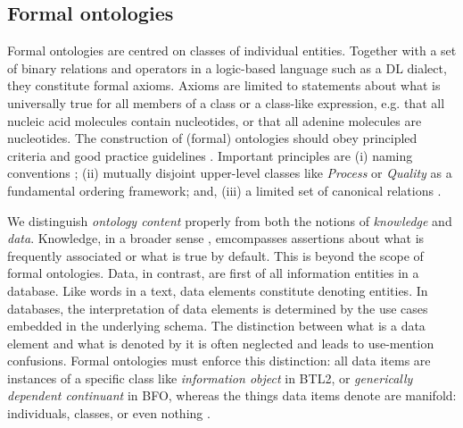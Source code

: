 \subsection*{Formal ontologies}

Formal ontologies are centred on classes of individual entities. Together with a set of binary relations and operators in a logic-based language such as a DL dialect, they constitute formal axioms. Axioms are limited to statements about what is universally true for all members of a class or a class-like expression, e.g. that all nucleic acid molecules contain nucleotides, or that all adenine molecules are nucleotides. The construction of (formal) ontologies should obey principled criteria \citep{Spear2006} and good practice guidelines \citep{Schulz2012}. Important principles are (i) naming conventions \citep{Schober2009}; (ii) mutually disjoint upper-level classes like \emph{Process} or \emph{Quality} as a fundamental ordering framework; and, (iii) a limited set of canonical relations \citep{Smith2005}. 

We distinguish \emph{ontology content} properly from both the notions of \emph{knowledge} \citep{Naturwissenschaften2014} and \emph{data}. Knowledge, in a broader sense \citep{Rector2008}, emcompasses assertions about what is frequently associated or what is true by default. This is beyond the scope of formal ontologies. Data, in contrast, are first of all information entities in a database. Like words in a text, data elements constitute denoting entities. 
In databases, the interpretation of data elements is determined by the use cases embedded in the underlying schema. The distinction between what is a data element and what is denoted by it is often neglected and leads to use-mention confusions. Formal ontologies must enforce this distinction: 
all data items are instances of a specific class like \textit{information object} in BTL2, or \textit{generically dependent continuant} in BFO, whereas the things data items denote are manifold: individuals, classes, or even nothing \citep{Schulz2011a}.

